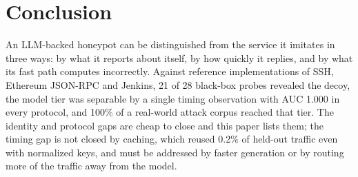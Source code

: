 \documentclass[conference]{IEEEtran}
\begin{document}
\section{Conclusion}
An LLM-backed honeypot can be distinguished from the service it imitates in three ways: by what it reports about itself, by how quickly it replies, and by what its fast path computes incorrectly. Against reference implementations of SSH, Ethereum JSON-RPC and Jenkins, 21 of 28 black-box probes revealed the decoy, the model tier was separable by a single timing observation with AUC 1.000 in every protocol, and 100\% of a real-world attack corpus reached that tier. The identity and protocol gaps are cheap to close and this paper lists them; the timing gap is not closed by caching, which reused 0.2\% of held-out traffic even with normalized keys, and must be addressed by faster generation or by routing more of the traffic away from the model.
\end{document}
